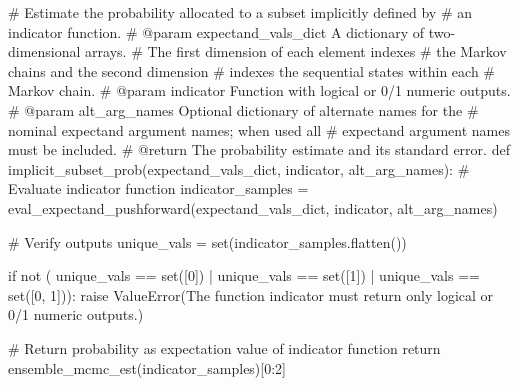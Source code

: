 \documentclass[
  letterpaper,
  DIV=11,
  numbers=noendperiod]{scrartcl}
\newenvironment{Shaded}{\begin{snugshade}}{\end{snugshade}}
\newcommand{\BuiltInTok}[1]{\textcolor[rgb]{0.00,0.23,0.31}{#1}}
\newcommand{\CommentTok}[1]{\textcolor[rgb]{0.37,0.37,0.37}{#1}}
\newcommand{\ControlFlowTok}[1]{\textcolor[rgb]{0.00,0.23,0.31}{#1}}
\newcommand{\DecValTok}[1]{\textcolor[rgb]{0.68,0.00,0.00}{#1}}
\newcommand{\KeywordTok}[1]{\textcolor[rgb]{0.00,0.23,0.31}{#1}}
\newcommand{\NormalTok}[1]{\textcolor[rgb]{0.00,0.23,0.31}{#1}}
\newcommand{\OperatorTok}[1]{\textcolor[rgb]{0.37,0.37,0.37}{#1}}
\newcommand{\PreprocessorTok}[1]{\textcolor[rgb]{0.68,0.00,0.00}{#1}}
\newcommand{\StringTok}[1]{\textcolor[rgb]{0.13,0.47,0.30}{#1}}
\begin{document}
\begin{Shaded}
\begin{Highlighting}[]
\CommentTok{\# Estimate the probability allocated to a subset implicitly defined by}
\CommentTok{\# an indicator function.}
\CommentTok{\# @param expectand\_vals\_dict A dictionary of two{-}dimensional arrays.}
\CommentTok{\#                            The first dimension of each element indexes}
\CommentTok{\#                            the Markov chains and the second dimension}
\CommentTok{\#                            indexes the sequential states within each}
\CommentTok{\#                            Markov chain.}
\CommentTok{\# @param indicator Function with logical or 0/1 numeric outputs.}
\CommentTok{\# @param alt\_arg\_names Optional dictionary of alternate names for the}
\CommentTok{\#                      nominal expectand argument names; when used all}
\CommentTok{\#                      expectand argument names must be included.}
\CommentTok{\# @return The probability estimate and its standard error.}
\KeywordTok{def}\NormalTok{ implicit\_subset\_prob(expectand\_vals\_dict,}
\NormalTok{                         indicator,}
\NormalTok{                         alt\_arg\_names):}
  \CommentTok{\# Evaluate indicator function}
\NormalTok{  indicator\_samples }\OperatorTok{=}\NormalTok{ eval\_expectand\_pushforward(expectand\_vals\_dict,}
\NormalTok{                                                 indicator,}
\NormalTok{                                                 alt\_arg\_names)}

  \CommentTok{\# Verify outputs}
\NormalTok{  unique\_vals }\OperatorTok{=} \BuiltInTok{set}\NormalTok{(indicator\_samples.flatten())}

  \ControlFlowTok{if} \KeywordTok{not}\NormalTok{ (  unique\_vals }\OperatorTok{==} \BuiltInTok{set}\NormalTok{([}\DecValTok{0}\NormalTok{])}
          \OperatorTok{|}\NormalTok{ unique\_vals }\OperatorTok{==} \BuiltInTok{set}\NormalTok{([}\DecValTok{1}\NormalTok{])}
          \OperatorTok{|}\NormalTok{ unique\_vals }\OperatorTok{==} \BuiltInTok{set}\NormalTok{([}\DecValTok{0}\NormalTok{, }\DecValTok{1}\NormalTok{])):}
    \ControlFlowTok{raise} \PreprocessorTok{ValueError}\NormalTok{(}\StringTok{\textquotesingle{}The function \textasciigrave{}indicator\textasciigrave{} must return only \textquotesingle{}}
                     \StringTok{\textquotesingle{}logical or 0/1 numeric outputs.\textquotesingle{}}\NormalTok{)}

  \CommentTok{\# Return probability as expectation value of indicator function}
  \ControlFlowTok{return}\NormalTok{ ensemble\_mcmc\_est(indicator\_samples)[}\DecValTok{0}\NormalTok{:}\DecValTok{2}\NormalTok{]}
\end{Highlighting}
\end{Shaded}
\end{document}
